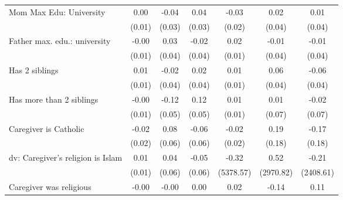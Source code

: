 {\begin{tabular}{l*{6}{c}}
\addlinespace
Mom Max Edu: University&        0.00         &       -0.04         &        0.04         &       -0.03         &        0.02         &        0.01         \\
                    &      (0.01)         &      (0.03)         &      (0.03)         &      (0.02)         &      (0.04)         &      (0.04)         \\
\addlinespace
Father max. edu.: university&       -0.00         &        0.03         &       -0.02         &        0.02         &       -0.01         &       -0.01         \\
                    &      (0.01)         &      (0.04)         &      (0.04)         &      (0.01)         &      (0.04)         &      (0.04)         \\
\addlinespace
Has 2 siblings      &        0.01         &       -0.02         &        0.02         &        0.01         &        0.06         &       -0.06         \\
                    &      (0.01)         &      (0.04)         &      (0.04)         &      (0.01)         &      (0.04)         &      (0.04)         \\
\addlinespace
Has more than 2 siblings&       -0.00         &       -0.12\sym{*}  &        0.12\sym{*}  &        0.01         &        0.01         &       -0.02         \\
                    &      (0.01)         &      (0.05)         &      (0.05)         &      (0.01)         &      (0.07)         &      (0.07)         \\
\addlinespace
Caregiver is Catholic&       -0.02         &        0.08         &       -0.06         &       -0.02         &        0.19         &       -0.17         \\
                    &      (0.02)         &      (0.06)         &      (0.06)         &      (0.02)         &      (0.18)         &      (0.18)         \\
\addlinespace
dv: Caregiver's religion is Islam&        0.01         &        0.04         &       -0.05         &       -0.32         &        0.52         &       -0.21         \\
                    &      (0.01)         &      (0.06)         &      (0.06)         &   (5378.57)         &   (2970.82)         &   (2408.61)         \\
\addlinespace
Caregiver was religious&       -0.00         &       -0.00         &        0.00         &        0.02         &       -0.14         &        0.11         \\

\end{tabular}}
